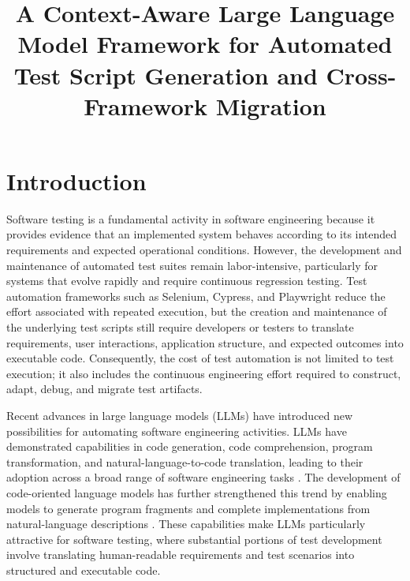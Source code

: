 \documentclass[pdflatex,sn-mathphys-num]{sn-jnl}
\title[
Context-Aware LLM-Based Test Generation and Migration
]{
A Context-Aware Large Language Model Framework for
Automated Test Script Generation and Cross-Framework Migration
}
\author*[1]{\fnm{Anand} \sur{Rawat}}\email{anandrawat138a@gmail.com}
\affil*[1]{
    \orgdiv{Department of Computer Science and Engineering},
    \orgname{Pranveer Singh Institute of Technology},
    \orgaddress{
        \city{Kanpur},
        \country{India}
    }
}
\begin{document}
\maketitle


\section{Introduction}
\label{sec:introduction}

Software testing is a fundamental activity in software engineering because it
provides evidence that an implemented system behaves according to its intended
requirements and expected operational conditions. However, the development and
maintenance of automated test suites remain labor-intensive, particularly for
systems that evolve rapidly and require continuous regression testing. Test
automation frameworks such as Selenium, Cypress, and Playwright reduce the
effort associated with repeated execution, but the creation and maintenance of
the underlying test scripts still require developers or testers to translate
requirements, user interactions, application structure, and expected outcomes
into executable code. Consequently, the cost of test automation is not limited
to test execution; it also includes the continuous engineering effort required
to construct, adapt, debug, and migrate test artifacts.

Recent advances in large language models (LLMs) have introduced new
possibilities for automating software engineering activities. LLMs have
demonstrated capabilities in code generation, code comprehension, program
transformation, and natural-language-to-code translation, leading to their
adoption across a broad range of software engineering tasks
\cite{fan2023llmse,hou2024llmslr}. The development of code-oriented language
models has further strengthened this trend by enabling models to generate
program fragments and complete implementations from natural-language
descriptions \cite{chen2021codex}. These capabilities make LLMs particularly
attractive for software testing, where substantial portions of test development
involve translating human-readable requirements and test scenarios into
structured and executable code.
\end{document}
